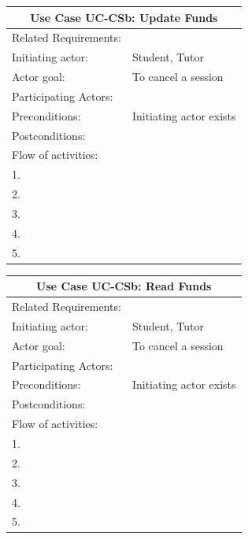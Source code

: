 \documentclass[12pt]{article}
\begin{document}
{		\begin{tabular}{| l | p{10cm}| }
			\hline\multicolumn{2}{|c|}{ \textbf{Use Case UC-CSb: Update Funds } }\\ \hline
			Related Requirements: &  \\ \hline
			Initiating actor: & Student, Tutor \\ \hline
			Actor goal: & To cancel a session\\ \hline
			Participating Actors: \\ \hline
			Preconditions: &Initiating actor exists\\ \hline
			Postconditions: & \\ \hline
			\multicolumn{2}{|l|}{Flow of activities:}\\ \hline
			\multicolumn{2}{|p{15cm}|}{1. }\\
			\multicolumn{2}{|p{15cm}|}{2. }\\
			\multicolumn{2}{|l|}{3. }\\
			\multicolumn{2}{|l|}{4. }\\
			\multicolumn{2}{|l|}{5. }\\
			 \hline
		\end{tabular}

		\begin{tabular}{| l | p{10cm}| }
			\hline\multicolumn{2}{|c|}{ \textbf{Use Case UC-CSb: Read Funds } }\\ \hline
			Related Requirements: &  \\ \hline
			Initiating actor: & Student, Tutor \\ \hline
			Actor goal: & To cancel a session\\ \hline
			Participating Actors: \\ \hline
			Preconditions: &Initiating actor exists\\ \hline
			Postconditions: & \\ \hline
			\multicolumn{2}{|l|}{Flow of activities:}\\ \hline
			\multicolumn{2}{|p{15cm}|}{1. }\\
			\multicolumn{2}{|p{15cm}|}{2. }\\
			\multicolumn{2}{|l|}{3. }\\
			\multicolumn{2}{|l|}{4. }\\
			\multicolumn{2}{|l|}{5. }\\
			 \hline
		\end{tabular}
	\newpage
}
\end{document}

